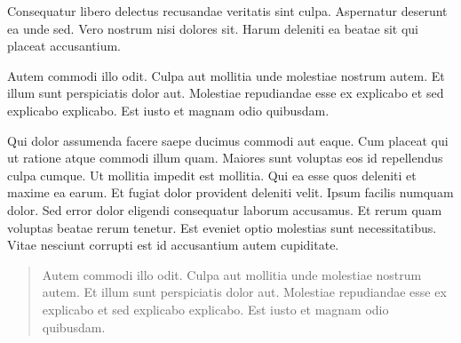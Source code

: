 


\vspace{\fill}

Consequatur libero delectus recusandae veritatis sint culpa. Aspernatur deserunt ea unde sed. Vero nostrum nisi dolores sit. Harum deleniti ea beatae sit qui placeat accusantium.

Autem commodi illo odit. \frqq{}Culpa aut mollitia unde molestiae nostrum autem. Et illum sunt perspiciatis dolor aut. Molestiae repudiandae esse ex explicabo et sed explicabo explicabo. Est iusto et magnam odio quibusdam.\flqq{} 

\clearpage

Qui dolor assumenda facere saepe ducimus commodi aut eaque. Cum placeat qui ut ratione atque commodi illum quam. Maiores sunt voluptas eos id repellendus culpa cumque. Ut mollitia impedit est mollitia. Qui ea esse quos deleniti et maxime ea earum. Et fugiat dolor provident deleniti velit. Ipsum facilis numquam dolor. Sed error dolor eligendi consequatur laborum accusamus. Et rerum quam voluptas beatae rerum tenetur. Est eveniet optio molestias sunt necessitatibus. Vitae nesciunt corrupti est id accusantium autem cupiditate.

\begin{quote}
Autem commodi illo odit. Culpa aut mollitia unde molestiae nostrum autem. Et illum sunt perspiciatis dolor aut. Molestiae repudiandae esse ex explicabo et sed explicabo explicabo. Est iusto et magnam odio quibusdam.
\end{quote}